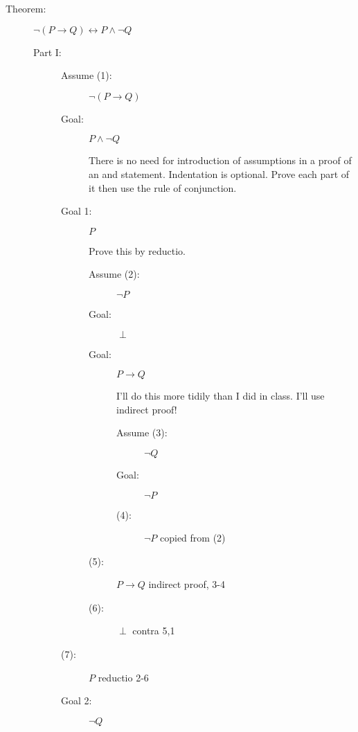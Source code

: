 \documentclass[12pt]{article}
\begin{document}
\begin{description}

\item[Theorem:]  $\neg(P \rightarrow Q) \leftrightarrow P \wedge \neg Q$

\begin{description}

\item[Part I:]

\begin{description}

\item[Assume (1):]  $\neg (P \rightarrow Q)$

\item[Goal:]  $P \wedge \neg Q$

There is no need for introduction of assumptions in a proof of an and statement.  Indentation is optional.  Prove each part of it then use the rule of conjunction.

\item[Goal 1:]  $P$

Prove this by reductio.

\begin{description}


\item[Assume (2):]  $\neg P$

\item[Goal:] $\perp$

\item[Goal:]  $P \rightarrow Q$

I'll do this more tidily than I did in class.  I'll use indirect proof!

\begin{description}

\item[Assume (3):]  $\neg Q$

\item[Goal:]  $\neg P$

\item[(4):]  $\neg P$  copied from (2)


\end{description}

\item[(5):]  $P \rightarrow Q$  indirect proof, 3-4

\item[(6):]  $\perp$  contra 5,1

\end{description}

\item[(7):]  $P$  reductio 2-6
\item[Goal 2:]  $\neg Q$


\end{description}
\end{description}
\end{description}
\end{document}
